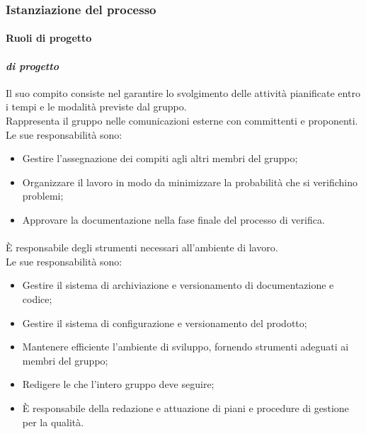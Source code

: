 \subsubsection{Istanziazione del processo}
\paragraph{Ruoli di progetto}
\paragraph*{\roleProjectManager{} \textit{di progetto}}
Il suo compito consiste nel garantire lo svolgimento delle attività pianificate entro i tempi e le modalità previste dal gruppo.\\
Rappresenta il gruppo nelle comunicazioni esterne con committenti e proponenti.\\
Le sue responsabilità sono:
\begin{itemize}
  \item Gestire l'assegnazione dei compiti agli altri membri del gruppo;
  \item Organizzare il lavoro in modo da minimizzare la probabilità che si verifichino problemi;
  \item Approvare la documentazione nella fase finale del processo di verifica.
\end{itemize}

\paragraph*{\roleAdministrator{}}
È responsabile degli strumenti necessari all'ambiente di lavoro.\\
Le sue responsabilità sono:
\begin{itemize}
  \item Gestire il sistema di archiviazione e versionamento di documentazione e codice;
  \item Gestire il sistema di configurazione e versionamento del prodotto;
  \item Mantenere efficiente l'ambiente di sviluppo, fornendo strumenti adeguati ai membri del gruppo;
  \item Redigere le \docNameVersionNdP{} che l'intero gruppo deve seguire;
  \item È responsabile della redazione e attuazione di piani e procedure di gestione per la qualità.
\end{itemize}

